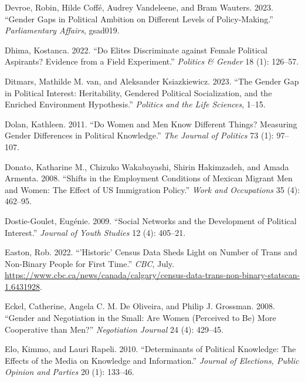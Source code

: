 \documentclass[
  letterpaper,
  DIV=11,
  numbers=noendperiod]{scrreprt}
\newlength{\cslhangindent}
\newlength{\cslentryspacingunit} %
\newenvironment{CSLReferences}[2] %
 {%
  \setlength{\parindent}{0pt}
  \ifodd #1
  \let\oldpar\par
  \def\par{\hangindent=\cslhangindent\oldpar}
  \fi
  \setlength{\parskip}{#2\cslentryspacingunit}
 }%
 {}
\begin{document}
\begin{CSLReferences}{1}{0}
\leavevmode{}%
Devroe, Robin, Hilde Coffé, Audrey Vandeleene, and Bram Wauters. 2023.
{``{Gender Gaps in Political Ambition on Different Levels of
Policy-Making}.''} \emph{Parliamentary Affairs}, gsad019.

\leavevmode{}%
Dhima, Kostanca. 2022. {``{Do Elites Discriminate against Female
Political Aspirants? Evidence from a Field Experiment}.''}
\emph{Politics \& Gender} 18 (1): 126--57.

\leavevmode{}%
Ditmars, Mathilde M. van, and Aleksander Ksiazkiewicz. 2023. {``{The
Gender Gap in Political Interest: Heritability, Gendered Political
Socialization, and the Enriched Environment Hypothesis}.''}
\emph{Politics and the Life Sciences}, 1--15.

\leavevmode{}%
Dolan, Kathleen. 2011. {``{Do Women and Men Know Different Things?
Measuring Gender Differences in Political Knowledge}.''} \emph{The
Journal of Politics} 73 (1): 97--107.

\leavevmode{}%
Donato, Katharine M., Chizuko Wakabayashi, Shirin Hakimzadeh, and Amada
Armenta. 2008. {``{Shifts in the Employment Conditions of Mexican
Migrant Men and Women: The Effect of US Immigration Policy}.''}
\emph{Work and Occupations} 35 (4): 462--95.

\leavevmode{}%
Dostie-Goulet, Eugénie. 2009. {``{Social Networks and the Development of
Political Interest}.''} \emph{Journal of Youth Studies} 12 (4): 405--21.

\leavevmode{}%
Easton, Rob. 2022. {``'Historic' Census Data Sheds Light on Number of
Trans and Non-Binary People for First Time.''} \emph{CBC}, July.
\url{https://www.cbc.ca/news/canada/calgary/census-data-trans-non-binary-statscan-1.6431928}.

\leavevmode{}%
Eckel, Catherine, Angela C. M. De Oliveira, and Philip J. Grossman.
2008. {``{Gender and Negotiation in the Small: Are Women (Perceived to
Be) More Cooperative than Men?}''} \emph{Negotiation Journal} 24 (4):
429--45.

\leavevmode{}%
Elo, Kimmo, and Lauri Rapeli. 2010. {``{Determinants of Political
Knowledge: The Effects of the Media on Knowledge and Information}.''}
\emph{Journal of Elections, Public Opinion and Parties} 20 (1): 133--46.


\end{CSLReferences}
\end{document}
